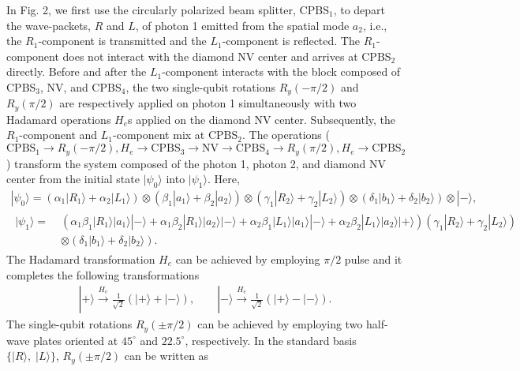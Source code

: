 \documentclass[showpacs,preprintnumbers,showkeys,amsmath,amssymb]{revtex4}%
\begin{document}
In Fig. 2, we first use the circularly polarized beam splitter, CPBS$_1$, to depart the wave-packets, $R$ and $L$, of photon 1 emitted from the spatial mode $a_2$, i.e., the $R_1$-component is transmitted and the $L_1$-component is reflected. The $R_1$-component does not interact with the diamond NV center and arrives at CPBS$_2$ directly. Before and after the $L_1$-component interacts with the block composed of CPBS$_3$, NV, and CPBS$_4$, the two single-qubit rotations $R_y(-\pi/2)$ and $R_y(\pi/2)$ are respectively applied on photon 1 simultaneously with two Hadamard operations $H_e$s applied on the diamond NV center. Subsequently, the $R_1$-component and $L_1$-component mix at CPBS$_2$. The operations ($\text{CPBS}_1 \rightarrow R_y(-\pi/2), H_e \rightarrow \text{CPBS}_3 \rightarrow \text{NV} \rightarrow \text{CPBS}_4 \rightarrow R_y(\pi/2), H_e \rightarrow \text{CPBS}_2$) transform the system composed of the photon 1, photon 2, and diamond NV center from the initial state $|\psi_0\rangle$ into $|\psi_1\rangle$. Here,
\begin{eqnarray}       \label{eq5}
|\psi_0\rangle=(\alpha_{1}|R_1\rangle + \alpha_{2}|L_1\rangle) \otimes (\beta_{1}|a_1\rangle + \beta_{2}|a_2\rangle)
\otimes (\gamma_{1}|R_2\rangle + \gamma_{2}|L_2\rangle) \otimes (\delta_{1}|b_1\rangle + \delta_{2}|b_2\rangle) \otimes |-\rangle,
\end{eqnarray}
%
%
\begin{eqnarray}       \label{eq6}
\begin{split}
|\psi_1\rangle=\;&
(\alpha_{1}\beta_{1}|R_1\rangle|a_1\rangle|-\rangle
+\alpha_{1}\beta_{2}|R_1\rangle|a_2\rangle|-\rangle
+\alpha_{2}\beta_{1}|L_1\rangle|a_1\rangle|-\rangle
+\alpha_{2}\beta_{2}|L_1\rangle|a_2\rangle|+\rangle)
 (\gamma_{1}|R_2\rangle + \gamma_{2}|L_2\rangle) \qquad\;\\&\otimes (\delta_{1}|b_1\rangle + \delta_{2}|b_2\rangle) .
\end{split}
\end{eqnarray}
The Hadamard transformation $H_e$ can be achieved by employing $\pi/2$ pulse and it completes the following transformations
\begin{eqnarray}       \label{eq7}
|+\rangle \xrightarrow{H_e} \frac{1}{\sqrt{2}}(|+\rangle+|-\rangle),  \qquad
|-\rangle \xrightarrow{H_e} \frac{1}{\sqrt{2}}(|+\rangle-|-\rangle).
\end{eqnarray}
%
The single-qubit rotations $R_y(\pm\pi/2)$ can be achieved by employing two half-wave plates oriented at $45^\circ$ and $22.5^\circ$, respectively. In the standard basis $\{|R\rangle,\;|L\rangle\}$,  $R_y(\pm\pi/2)$  can be written as
\end{document}
